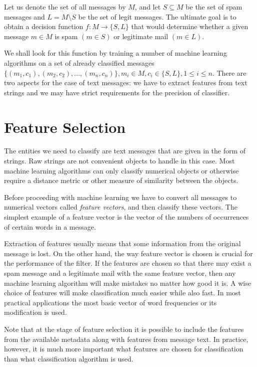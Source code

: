 \documentclass[12pt]{report}
\begin{document}
Let us denote the set of all messages by $M$, and let $S \subseteq M$ be the set of spam messages and $L = M \setminus S$ be the set of legit messages. The ultimate goal is to obtain a decision function $f : M \rightarrow \{S, L\}$ that would determine whether a given message $m \in M$ is spam $(m \in S)$ or legitimate mail $(m \in L)$.

We shall look for this function by training a number of machine learning algorithms on a set of already classified messages $\{(m_1, c_1), (m_2, c_2), ..., (m_n, c_n)\}, m_i \in M, c_i \in \{S, L\}, 1 \leq i \leq n$. There are two aspects for the case of text messages: we have to extract features from text strings and we may have strict requirements for the precision of classifier.

\newpage

\section{Feature Selection}

The entities we need to classify are text messages that are given in the form of strings. Raw strings are not convenient objects to handle in this case. Most machine learning algorithms can only classify numerical objects or otherwise require a distance metric or other measure of similarity between the objects.

Before proceeding with machine learning we have to convert all messages to numerical vectors called \textit{feature vectors}, and then classify these vectors. The simplest example of a feature vector is the vector of the numbers of occurrences of certain words in a message. 

Extraction of features usually means that some information from the original message is lost. On the other hand, the way feature vector is chosen is crucial for the performance of the filter. If the features are chosen so that there may exist a spam message and a legitimate mail with the same feature vector, then any machine learning algorithm will make mistakes no matter how good it is. A wise choice of features will make classification much easier while also fast. In most practical applications the most basic vector of word frequencies or its modification is used.

Note that at the stage of feature selection it is possible to include the features from the available metadata along with features from message text. In practice, however, it is much more important what features are chosen for classification than what classification algorithm is used.
\end{document}
